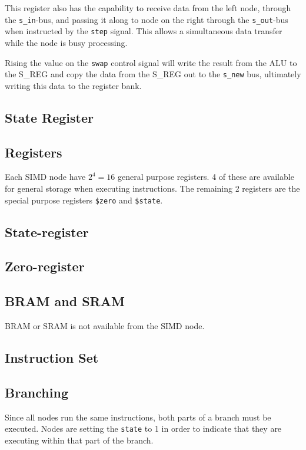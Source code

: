 This register also has the capability to receive data from the left node,
through the {\tt s\_in}-bus, and passing it along to node on the right through
the {\tt s\_out}-bus when instructed by the {\tt step} signal. This allows a
simultaneous data transfer while the node is busy processing.

Rising the value on the {\tt swap} control signal will write the result from the
ALU to the S\_REG and copy the data from the S\_REG out to the {\tt s\_new} bus,
ultimately writing this data to the register bank.

\subsection{State Register}

\subsection{Registers}
Each SIMD node have $2^4 = 16$ general purpose registers. 4 of these are
available for general storage when executing instructions. The remaining 2
registers are the special purpose registers {\tt \$zero} and {\tt \$state}.



\subsection{State-register}

\subsection{Zero-register}

\subsection{BRAM and SRAM}
BRAM or SRAM is not available from the SIMD node.

\subsection{Instruction Set}




\subsection{Branching}
Since all nodes run the same instructions, both parts of a branch must be
executed. Nodes are setting the {\tt state} to 1 in order to indicate that they
are executing within that part of the branch.

